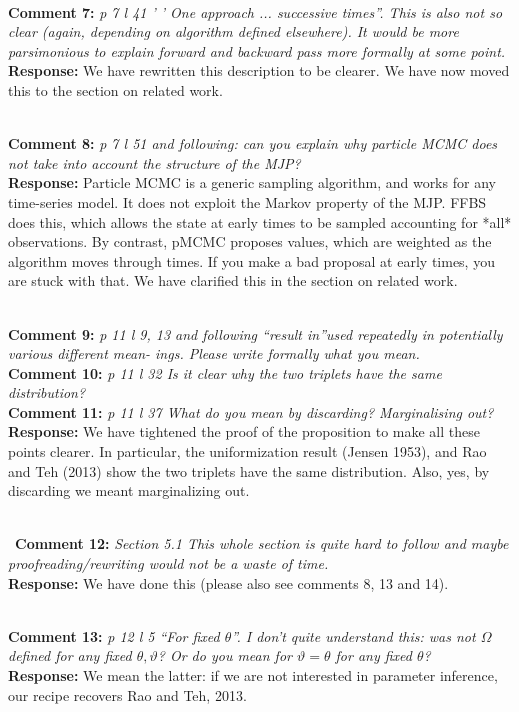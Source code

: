 \documentclass[11pt]{article}
\newcommand{\rev}[2]{\textbf{Comment #1: }\emph{#2}}
\newcommand{\resp}{\textbf{Response: }}
\begin{document}
~\\
\rev{7}{p 7 l 41 ’ ’ One approach ... successive times”. This is also not so clear (again, depending on algorithm defined elsewhere). It would be more parsimonious to explain forward and backward pass more formally at some point.} \\ 
\resp We have rewritten this description to be clearer. We have now moved this to the section on related work.

~\\
\rev{8}{p 7 l 51 and following: can you explain why particle MCMC does not take into account the structure of the MJP?}\\
\resp Particle MCMC is a generic sampling algorithm, and works for any time-series model. It does not exploit the Markov property of the MJP. FFBS does this, which allows the state at early times to be sampled accounting for *all* observations. By contrast, pMCMC proposes values, which are weighted as the algorithm moves through times. If you make a bad proposal at early times, you are stuck with that. We have clarified this in the section on related work.

~\\
\rev{9}{p 11 l 9, 13 and following “result in”used repeatedly in potentially various different mean- ings. Please write formally what you mean.}
~\\
\rev{10}{ p 11 l 32 Is it clear why the two triplets have the same distribution? }\\ 
\rev{11}{p 11 l 37 What do you mean by discarding? Marginalising out?} \\
\resp We have tightened the proof of the proposition to make all these points clearer. In particular, the uniformization result (Jensen 1953), and Rao and Teh (2013) show the two triplets have the same distribution. Also, yes, by discarding we meant marginalizing out.

~\\
~\rev{12}{Section 5.1 This whole section is quite hard to follow and maybe proofreading/rewriting would not be a waste of time. } \\ 
\resp{We have done this (please also see comments 8, 13 and 14).} 

~\\
\rev{13}{p 12 l 5 “For fixed $\theta$”. I don’t quite understand this: was not $\Omega$ defined for any fixed $\theta, \vartheta$? Or do you mean for $\vartheta=\theta$ for any fixed $\theta$? }\\
\resp We mean the latter: if we are not interested in parameter inference, our recipe recovers Rao and Teh, 2013.
\end{document}
